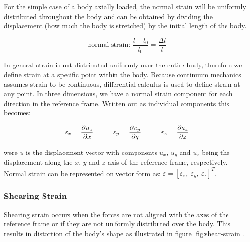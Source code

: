 For the simple case of a body axially loaded,
the normal strain will be uniformly distributed throughout the body
and can be obtained by dividing the displacement (how much the body is
stretched) by the initial length of the body.

\begin{equation}
\mbox{normal strain: } \frac{l-l_0}{l_0} = \frac{\Delta l}{l}
\end{equation}

In general strain is not distributed uniformly over the entire
body, therefore we define strain at a specific point within the
body. Because continuum mechanics assumes strain to be continuous,
differential calculus is used to define strain at any point.
In three dimensions, we have a normal strain component
for each direction in the reference frame. Written out as individual
components this becomes: 

\begin{equation}
\label{eq:individual-normal-strain}
\varepsilon_x = \frac{\partial u_x}{\partial x} \hspace{10 mm}
\varepsilon_y = \frac{\partial u_y}{\partial y} \hspace{10 mm}
\varepsilon_z = \frac{\partial u_z}{\partial z}
\end{equation}

were $u$ is the displacement vector with components $u_x$, $u_y$ and
$u_z$ being the displacement along the $x$, $y$ and $z$ axis of the
reference frame, respectively. Normal strain can be represented on
vector form as:
$\varepsilon = [ \varepsilon_x, \ \varepsilon_y, \ \varepsilon_z ]^T$.

\subsubsection{Shearing Strain}
Shearing strain occurs when the forces are not aligned with the axes
of the reference frame or if they are not uniformly distributed over
the body. This results in distortion of the body's shape as
illustrated in figure \vref{fig:shear-strain}.


